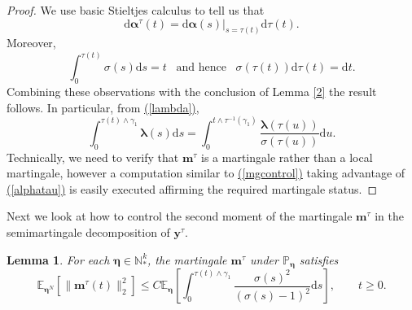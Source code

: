 \documentclass[12pt, leqno]{article}
\newtheorem{lemma}{Lemma}
\renewcommand{\eqref}[1]{\hyperref[#1]{(\ref*{#1})}}
\newcommand*{\norm}[1]{\lVert #1 \rVert}
\newcommand{\dd}{{\mathrm d}}
\begin{document}
\begin{proof}
We use basic Stieltjes calculus  to tell us that 
\begin{equation*}
\dd \bm\alpha^\tau(t) = \dd \bm\alpha(s)|_{s = \tau(t)}\dd \tau(t).
\end{equation*}
Moreover, 
\begin{equation}
\int_0^{\tau(t)} \sigma(s)\dd s = t \,\,\,\text{ and hence } \,\,\, \sigma(\tau(t))\dd \tau(t) = \dd t %
\label{dt}.
\end{equation}
Combining these observations with the conclusion of  Lemma \ref{2} the result follows. 
In particular, from \eqref{lambda},
\begin{equation}
\int_0^{\tau(t)\wedge \gamma_1} \bm\lambda(s)\dd s = \int_0^{t \wedge\tau^{-1}(\gamma_1)} \frac{\bm\lambda(\tau (u))}{\sigma(\tau(u))}\dd u.
\label{dt2}
\end{equation}
Technically, we need to verify that $\bm m^\tau$ is a martingale rather than a local martingale, however a computation similar to \eqref{mgcontrol} taking advantage of \eqref{alphatau} is easily executed affirming the required martingale status. 
\end{proof}

Next we look at how to control the second moment of the martingale $\bm m^\tau$ in the semimartingale decomposition of $\bm y^\tau$. 



\begin{lemma}\label{2upper}
For each $\bm\eta \in\mathbb{N}^k_*$, the martingale $\bm m^\tau$ under $\mathbb{P}_{\bm \eta}$ satisfies
\[
\mathbb{E}_{\bm \eta^N}\left[\norm{\bm m^\tau(t)}^2_2\right] \leq C\mathbb{E}_{\bm\eta}\left[ \int_0^{\tau(t  ) \wedge\gamma_1}\frac{\sigma(s)^2}{(\sigma(s)-1)^2} \dd s\right] , \qquad t\geq0.
\]
\end{lemma}
\end{document}
